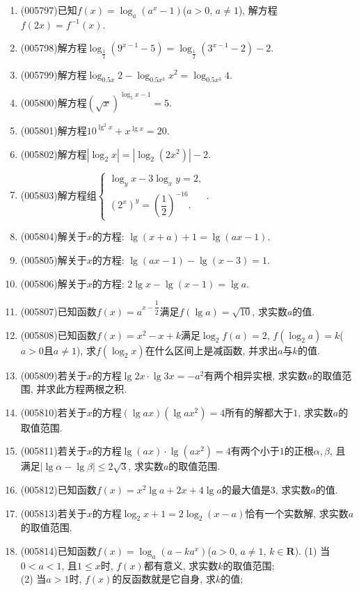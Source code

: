 \documentclass[10pt,a4paper]{article}
\begin{document}
\begin{enumerate}[1.]
\item {\tiny (005797)}已知$f(x)=\log_a(a^x-1)$($a>0$, $a\ne 1$), 解方程$f(2x)=f^{-1}(x)$.
\item {\tiny (005798)}解方程$\log_{\frac 12}(9^{x-1}-5)=\log_{\frac 12}(3^{x-1}-2)-2$.
\item {\tiny (005799)}解方程$\log_{0.5x}2-\log_{0.5x^3}x^2=\log_{0.5x^3}4$.
\item {\tiny (005800)}解方程$(\sqrt x)^{\log_5x-1}=5$.
\item {\tiny (005801)}解方程$10^{\lg ^2x}+x^{\lg x}=20$.
\item {\tiny (005802)}解方程$|\log_2x|=|\log_2(2x^2)|-2$.
\item {\tiny (005803)}解方程组$\begin{cases} \log_yx-3\log_xy=2, \\ (2^x)^y=(\dfrac 12)^{-16}. \end{cases}$.
\item {\tiny (005804)}解关于$x$的方程: $\lg (x+a)+1=\lg (ax-1)$.
\item {\tiny (005805)}解关于$x$的方程: $\lg (ax-1)-\lg (x-3)=1$.
\item {\tiny (005806)}解关于$x$的方程: $2\lg x-\lg (x-1)=\lg a$.
\item {\tiny (005807)}已知函数$f(x)=a^{x-\dfrac 12}$满足$f(\lg a)=\sqrt {10}$, 求实数$a$的值.
\item {\tiny (005808)}已知函数$f(x)=x^2-x+k$满足$\log_2f(a)=2$, $f(\log_2a)=k$($a>0$且$a\ne 1$), 求$f(\log_2x)$在什么区间上是减函数, 并求出$a$与$k$的值.
\item {\tiny (005809)}若关于$x$的方程$\lg 2x\cdot \lg 3x=-a^2$有两个相异实根, 求实数$a$的取值范围, 并求此方程两根之积.
\item {\tiny (005810)}若关于$x$的方程$(\lg ax)(\lg ax^2)=4$所有的解都大于$1$, 求实数$a$的取值范围.
\item {\tiny (005811)}若关于$x$的方程$\lg (ax)\cdot \lg (ax^2)=4$有两个小于$1$的正根$\alpha ,\beta$, 且满足$|\lg \alpha -\lg \beta|\le 2\sqrt 3$, 求实数$a$的取值范围.
\item {\tiny (005812)}已知函数$f(x)=x^2\lg a+2x+4\lg a$的最大值是$3$, 求实数$a$的值.
\item {\tiny (005813)}若关于$x$的方程$\log_2x+1=2\log_2(x-a)$恰有一个实数解, 求实数$a$的取值范围.
\item {\tiny (005814)}已知函数$f(x)=\log_a(a-ka^x)$($a>0$, $a\ne 1$, $k\in \mathbf{R}$).
(1) 当$0<a<1$, 且$1\le x$时, $f(x)$都有意义, 求实数$k$的取值范围;\\
(2) 当$a>1$时, $f(x)$的反函数就是它自身, 求$k$的值;\\

\end{enumerate}
\end{document}

